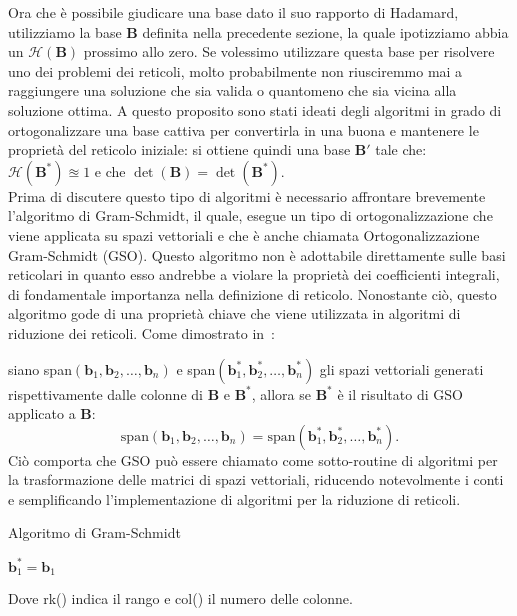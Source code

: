 Ora che è possibile giudicare una base dato il suo rapporto di Hadamard, utilizziamo la base
$\mathbf{B}$ definita nella precedente sezione, la quale ipotizziamo abbia un 
$\mathcal{H}(\mathbf{B})$ prossimo allo zero. Se volessimo utilizzare questa base per risolvere
uno dei problemi dei reticoli, molto probabilmente non riusciremmo mai a raggiungere una soluzione
che sia valida o quantomeno che sia vicina alla soluzione ottima.
A questo proposito sono stati ideati degli algoritmi in grado di ortogonalizzare una base
cattiva per convertirla in una buona e mantenere le proprietà del reticolo iniziale: si
ottiene quindi una base $\mathbf{B'}$ tale che: 
$\mathcal{H}(\mathbf{B}^*) \approxeq 1$ e che $\det(\mathbf{B}) = \det(\mathbf{B}^*)$.
\\
Prima di discutere questo tipo di algoritmi è necessario affrontare brevemente 
l'algoritmo di Gram-Schmidt, il quale, esegue un tipo di ortogonalizzazione che viene applicata
su spazi vettoriali e che è anche chiamata Ortogonalizzazione Gram-Schmidt (GSO).
Questo algoritmo non è adottabile direttamente sulle basi reticolari in quanto esso andrebbe a 
violare la proprietà dei coefficienti integrali, di fondamentale importanza nella
definizione di reticolo. Nonostante ciò, questo algoritmo gode di una proprietà chiave che
viene utilizzata in algoritmi di riduzione dei reticoli. Come dimostrato in~\cite[Teorema 7.13]{HDMRD08}:

siano span$(\mathbf{b}_1, \mathbf{b}_2, \dots, \mathbf{b}_n)$ e 
span$(\mathbf{b}_1^*, \mathbf{b}_2^*, \dots, \mathbf{b}_n^*)$ 
gli spazi vettoriali generati rispettivamente dalle colonne di $\mathbf{B}$ e $\mathbf{B}^*$,
allora se $\mathbf{B}^*$ è il risultato di GSO applicato a $\mathbf{B}$:
\[
\text{span}(\mathbf{b}_1, \mathbf{b}_2, \dots, \mathbf{b}_n) =
\text{span}(\mathbf{b}_1^*, \mathbf{b}_2^*, \dots, \mathbf{b}_n^*).
\]
Ciò comporta che GSO può essere chiamato come sotto-routine di algoritmi per la trasformazione
delle matrici di spazi vettoriali, riducendo notevolmente i conti e semplificando l'implementazione
di algoritmi per la riduzione di reticoli.

\begin{algorithm}
    \caption{Algoritmo di Gram-Schmidt}
    \label{alg:one}
    \large
    \DontPrintSemicolon
    $\mathbf{b}_1^* = \mathbf{b}_1$\;
\end{algorithm}
Dove rk() indica il rango e col() il numero delle colonne. 

